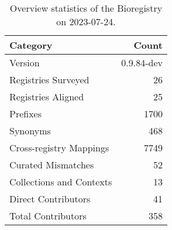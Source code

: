 \begin{table}
\caption{Overview statistics of the Bioregistry on 2023-07-24.}
\label{tab:bioregistry-summary}
\begin{tabular}{lr}
\toprule
Category & Count \\
\midrule
Version & 0.9.84-dev \\
Registries Surveyed & 26 \\
Registries Aligned & 25 \\
Prefixes & 1700 \\
Synonyms & 468 \\
Cross-registry Mappings & 7749 \\
Curated Mismatches & 52 \\
Collections and Contexts & 13 \\
Direct Contributors & 41 \\
Total Contributors & 358 \\
\bottomrule
\end{tabular}
\end{table}
